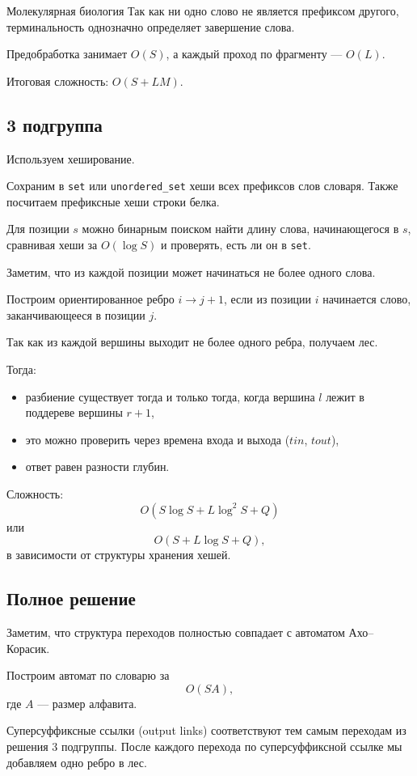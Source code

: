 \begin{tutorial}{Молекулярная биология}
Так как ни одно слово не является префиксом другого, терминальность однозначно определяет завершение слова.

Предобработка занимает $O(S)$, а каждый проход по фрагменту --- $O(L)$.

Итоговая сложность: $O(S + LM)$.

\subsection*{3 подгруппа}

Используем хеширование.

Сохраним в \texttt{set} или \texttt{unordered\_set} хеши всех префиксов слов словаря. Также посчитаем префиксные хеши строки белка.

Для позиции $s$ можно бинарным поиском найти длину слова, начинающегося в $s$, сравнивая хеши за $O(\log S)$ и проверять, есть ли он в \texttt{set}.

Заметим, что из каждой позиции может начинаться не более одного слова.

Построим ориентированное ребро $i \to j+1$, если из позиции $i$ начинается слово, заканчивающееся в позиции $j$.

Так как из каждой вершины выходит не более одного ребра, получаем лес.

Тогда:
\begin{itemize}
    \item разбиение существует тогда и только тогда, когда вершина $l$ лежит в поддереве вершины $r+1$,
    \item это можно проверить через времена входа и выхода ($tin$, $tout$),
    \item ответ равен разности глубин.
\end{itemize}

Сложность:
\[
O(S \log S + L \log^2 S + Q)
\]
или
\[
O(S + L \log S + Q),
\]
в зависимости от структуры хранения хешей.


\subsection*{Полное решение}

Заметим, что структура переходов полностью совпадает с автоматом Ахо--Корасик.

Построим автомат по словарю за
\[
O(SA),
\]
где $A$ --- размер алфавита.

Суперсуффиксные ссылки (output links) соответствуют тем самым переходам из решения 3 подгруппы.
После каждого перехода по суперсуффиксной ссылке мы добавляем одно ребро в лес.


\end{tutorial}
